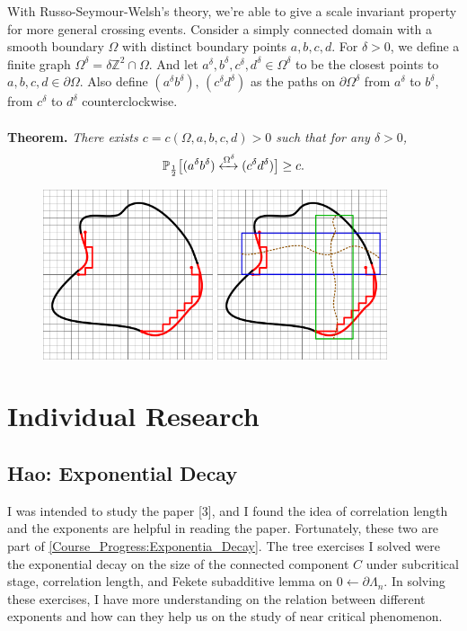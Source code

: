 \documentclass[12pt]{article}
\theoremstyle{plane}
\theoremstyle{definition}
\begin{document}
With Russo-Seymour-Welsh's theory, we're able to give a scale invariant property for more general crossing events. Consider a simply connected domain with a smooth boundary $\Omega$ with distinct boundary points $a,b,c,d$. For $\delta>0$, we define a finite graph $\Omega^\delta=\delta\mathbb{Z}^2\cap\Omega$. And let $a^\delta, b^\delta, c^\delta, d^\delta\in\Omega^\delta$ to be the closest points to $a,b,c,d\in\partial\Omega$. Also define $(a^\delta b^\delta),\,(c^\delta d^\delta)$ as the paths on $\partial\Omega^\delta$ from $a^\delta$ to $b^\delta$, from $c^\delta$ to $d^\delta$ counterclockwise.\\ \\
\textbf{Theorem.} \textit{There exists $c=c(\Omega,a,b,c,d)>0$ such that for any $\delta>0$,}
\begin{equation*}
\mathbb{P}_\frac{1}{2}\big[(a^\delta b^\delta)\xleftrightarrow{\text{$\Omega^\delta$}}(c^\delta d^\delta)\big]\geq c.
\end{equation*}
    
\begin{figure}[h]
\centering
\includegraphics[width=5.0cm]{./picture/omega_2.png}
\includegraphics[width=5.0cm]{./picture/omega_2_crossing.png}
\end{figure}
\newpage
    

\section{Individual Research}
\subsection*{Hao: Exponential Decay}
I was intended to study the paper [3], and I found the idea of correlation length and the exponents are helpful in reading the paper. Fortunately, these two are part of \ref{Course_Progress:Exponentia_Decay}. 
The tree exercises I solved were the exponential decay on the size of the connected component $C$ under subcritical stage, correlation length, and Fekete subadditive lemma on $0 \longleftarrow \partial \Lambda_n$.
In solving these exercises, I have more understanding on the relation between different exponents and how can they help us on the study of near critical phenomenon.  
\bigskip
\end{document}
